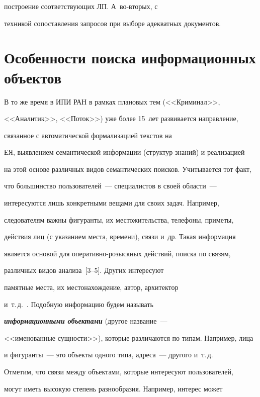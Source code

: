 построение соответствующих ЛП. А~во-вто\-рых, с 


техникой сопоставления запросов при выборе адекватных документов. 


    


\section{Особенности поиска информационных объектов}


    


    В то же время в ИПИ РАН в рамках плановых тем (<<Криминал>>, 


<<Аналитик>>, <<Поток>>) уже более 15~лет развивается направление, 


связанное с автоматической формализацией текстов на 


ЕЯ, выявлением семантической информации (структур знаний) и реализацией 


на этой основе различных видов семантических поисков. Учитывается тот факт, 


что большинство пользователей~--- специалистов в своей области~--- 


интересуются лишь конкретными вещами для своих задач. Например, 


следователям важны фигуранты, их местожительства, телефоны, приметы, 


действия лиц (с указанием места, времени), связи и~др. Такая информация 


является основой для опе\-ра\-тив\-но-ро\-зыск\-ных действий, поиска по связям, 


различных видов анализа~[3--5]. Других интересуют 


памятные места, их местонахождение, автор, архитектор 


    и~т.\,д.~\cite{7-kuz, 8-kuz}. Подобную информацию будем называть 


{\bfseries\textit{информационными объектами}} (другое название~--- 


<<именованные сущности>>), которые различаются по типам. Например, лица 


и фигуранты~--- это объекты одного типа, адреса~--- другого и~т.\,д. 


    


    Отметим, что связи между объектами, которые интересуют пользователей, 


могут иметь высокую степень разнообразия. Например, интерес может 


